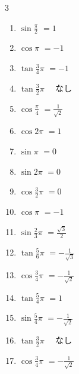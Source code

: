\begin{multicols}{3}
\begin{enumerate}
  \item $\displaystyle \sin{\frac{\pi}{2}}$
        $\displaystyle =1$

  \item $\displaystyle \cos{\pi}$
        $\displaystyle =-1$

  \item $\displaystyle \tan{\frac{3}{4}\pi}$
        $\displaystyle =-1$

  \item $\displaystyle \tan{\frac{3}{2}\pi}$
        $\displaystyle \quad なし$

  \item $\displaystyle \cos{\frac{\pi}{4}}$
        $\displaystyle =\frac{1}{\sqrt{2}}$

  \item $\displaystyle \cos{2\pi}$
        $\displaystyle =1$

  \item $\displaystyle \sin{\pi}$
        $\displaystyle =0$

  \item $\displaystyle \sin{2\pi}$
        $\displaystyle =0$

  \item $\displaystyle \cos{\frac{3}{2}\pi}$
        $\displaystyle =0$

  \item $\displaystyle \cos{\pi}$
        $\displaystyle =-1$

  \item $\displaystyle \sin{\frac{2}{3}\pi}$
        $\displaystyle =\frac{\sqrt{3}}{2}$

  \item $\displaystyle \tan{\frac{5}{6}\pi}$
        $\displaystyle =-\frac{1}{\sqrt{3}}$

  \item $\displaystyle \cos{\frac{3}{4}\pi}$
        $\displaystyle =-\frac{1}{\sqrt{2}}$

  \item $\displaystyle \tan{\frac{5}{4}\pi}$
        $\displaystyle =1$

  \item $\displaystyle \sin{\frac{5}{4}\pi}$
        $\displaystyle =-\frac{1}{\sqrt{2}}$

  \item $\displaystyle \tan{\frac{3}{2}\pi}$
        $\displaystyle \quad なし$

  \item $\displaystyle \cos{\frac{3}{4}\pi}$
        $\displaystyle =-\frac{1}{\sqrt{2}}$


\end{enumerate}
\end{multicols}
